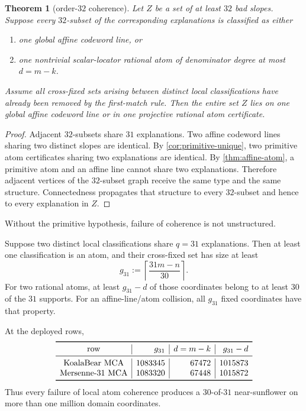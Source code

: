 \documentclass[11pt,a4paper]{amsart}
\numberwithin{equation}{section}
\newtheorem{theorem}{Theorem}[section]
\theoremstyle{remark}
\newcommand{\ceil}[1]{\left\lceil #1\right\rceil}\newcommand{\defeq}{\coloneqq}
\begin{document}
\begin{theorem}[order-$32$ coherence]\label{thm:coherence}
Let $Z$ be a set of at least $32$ bad slopes.  Suppose every $32$-subset of the corresponding explanations is classified as either
\begin{enumerate}[label=\textup{(\alph*)}]
\item one global affine codeword line, or
\item one nontrivial scalar-locator rational atom of denominator degree at most $d=m-k$.
\end{enumerate}
Assume all cross-fixed sets arising between distinct local classifications have already been removed by the first-match rule.  Then the entire set $Z$ lies on one global affine codeword line or in one projective rational atom certificate.
\end{theorem}

\begin{proof}
Adjacent $32$-subsets share $31$ explanations.  Two affine codeword lines sharing two distinct slopes are identical.  By \cref{cor:primitive-unique}, two primitive atom certificates sharing two explanations are identical.  By \cref{thm:affine-atom}, a primitive atom and an affine line cannot share two explanations.  Therefore adjacent vertices of the $32$-subset graph receive the same type and the same structure.  Connectedness propagates that structure to every $32$-subset and hence to every explanation in $Z$.
\end{proof}

Without the primitive hypothesis, failure of coherence is not unstructured.

\begin{corollary}\label{cor:near-sunflower}
Suppose two distinct local classifications share $q=31$ explanations.  Then at least one classification is an atom, and their cross-fixed set has size at least
\[
 g_{31}:=\ceil{\frac{31m-n}{30}}.
\]
For two rational atoms, at least $g_{31}-d$ of those coordinates belong to at least $30$ of the $31$ supports.  For an affine-line/atom collision, all $g_{31}$ fixed coordinates have that property.

At the deployed rows,
\[
\begin{array}{c|r|r|r}
\toprule
\text{row}&g_{31}&d=m-k&g_{31}-d\\
\midrule
\text{KoalaBear MCA}&1083345&67472&1015873\\
\text{Mersenne-31 MCA}&1083320&67448&1015872\\
\bottomrule
\end{array}
\]
Thus every failure of local atom coherence produces a $30$-of-$31$ near-sunflower on more than one million domain coordinates.
\end{corollary}
\end{document}
